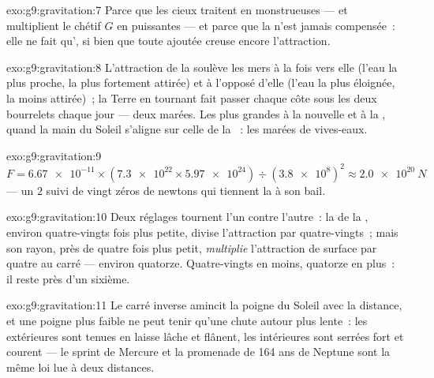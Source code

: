 \begin{solution}{exo:g9:gravitation:7}
Parce que les cieux traitent en  monstrueuses ---  et
 multiplient le chétif $G$ en  puissantes --- et parce
que la  n'est jamais compensée~: elle ne fait qu',
si bien que toute  ajoutée creuse encore l'attraction.
\end{solution}

\begin{solution}{exo:g9:gravitation:8}
L'attraction de la  soulève les mers à la fois vers elle (l'eau la
plus proche, la plus fortement attirée) et à l'opposé d'elle (l'eau la
plus éloignée, la moins attirée)~; la Terre en tournant fait passer
chaque côte sous les deux bourrelets chaque jour --- deux marées. Les
plus grandes à la nouvelle et à la , quand la main du
Soleil s'aligne sur celle de la ~: les marées de vives-eaux.
\end{solution}

\begin{solution}{exo:g9:gravitation:9}
$F = \num{6.67e-11} \times (\num{7.3e22} \times
\num{5.97e24}) \div (\num{3.8e8})^2 \approx \qty{2.0e20}{N}$ --- un
$2$ suivi de vingt zéros de newtons qui tiennent la  à son bail.
\end{solution}

\begin{solution}{exo:g9:gravitation:10}
Deux réglages tournent l'un contre l'autre~: la  de la ,
environ quatre-vingts fois plus petite, divise l'attraction par
quatre-vingts~; mais son rayon, près de quatre fois plus petit,
\emph{multiplie} l'attraction de surface par quatre au carré ---
environ quatorze. Quatre-vingts en moins, quatorze en plus~: il reste
près d'un sixième.
\end{solution}

\begin{solution}{exo:g9:gravitation:11}
Le carré inverse amincit la poigne du Soleil avec la distance, et une
poigne plus faible ne peut tenir qu'une chute autour plus lente~: les
 extérieures sont tenues en laisse lâche et flânent, les
intérieures sont serrées fort et courent --- le sprint de Mercure et
la promenade de 164 ans de Neptune sont la même loi lue à deux
distances.
\end{solution}

